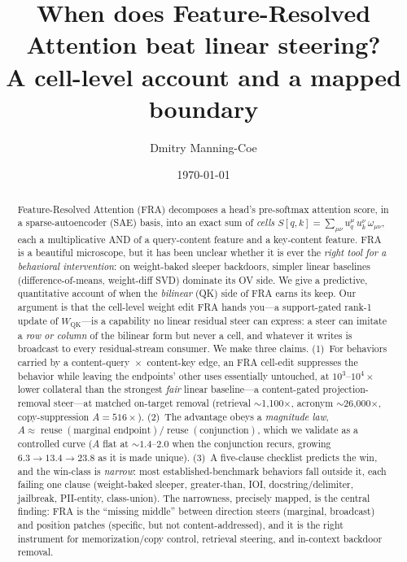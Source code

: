 \documentclass[11pt]{article}
\title{When does Feature-Resolved Attention beat linear steering?\\
A cell-level account and a mapped boundary}
\author{Dmitry Manning-Coe}
\date{\today}
\newcommand{\QK}{\mathrm{QK}}
\newcommand{\reuse}{\operatorname{reuse}}
\theoremstyle{definition}
\theoremstyle{plain}
\theoremstyle{remark}
\begin{document}
\maketitle

\begin{abstract}
Feature-Resolved Attention (FRA) decomposes a head's pre-softmax attention score, in a sparse-autoencoder (SAE) basis, into an exact sum of \emph{cells} $S[q,k]=\sum_{\mu\nu} u^\mu_q\,u^\nu_k\,\omega_{\mu\nu}$, each a multiplicative AND of a query-content feature and a key-content feature. FRA is a beautiful microscope, but it has been unclear whether it is ever the \emph{right tool for a behavioral intervention}: on weight-baked sleeper backdoors, simpler linear baselines (difference-of-means, weight-diff SVD) dominate its OV side. We give a predictive, quantitative account of when the \emph{bilinear} (QK) side of FRA earns its keep. Our argument is that the cell-level weight edit FRA hands you---a support-gated rank-1 update of $W_{\QK}$---is a capability no linear residual steer can express: a steer can imitate a \emph{row or column} of the bilinear form but never a cell, and whatever it writes is broadcast to every residual-stream consumer. We make three claims. (1)~For behaviors carried by a content-query~$\times$~content-key edge, an FRA cell-edit suppresses the behavior while leaving the endpoints' other uses essentially untouched, at $10^3$--$10^4\times$ lower collateral than the strongest \emph{fair} linear baseline---a content-gated projection-removal steer---at matched on-target removal (retrieval $\sim$1{,}100$\times$, acronym $\sim$26{,}000$\times$, copy-suppression $A{=}516\times$). (2)~The advantage obeys a \emph{magnitude law}, $A \approx \reuse(\text{marginal endpoint})/\reuse(\text{conjunction})$, which we validate as a controlled curve ($A$ flat at ${\sim}1.4$--$2.0$ when the conjunction recurs, growing $6.3{\to}13.4{\to}23.8$ as it is made unique). (3)~A five-clause checklist predicts the win, and the win-class is \emph{narrow}: most established-benchmark behaviors fall outside it, each failing one clause (weight-baked sleeper, greater-than, IOI, docstring/delimiter, jailbreak, PII-entity, class-union). The narrowness, precisely mapped, is the central finding: FRA is the ``missing middle'' between direction steers (marginal, broadcast) and position patches (specific, but not content-addressed), and it is the right instrument for memorization/copy control, retrieval steering, and in-context backdoor removal.
\end{abstract}
\end{document}
